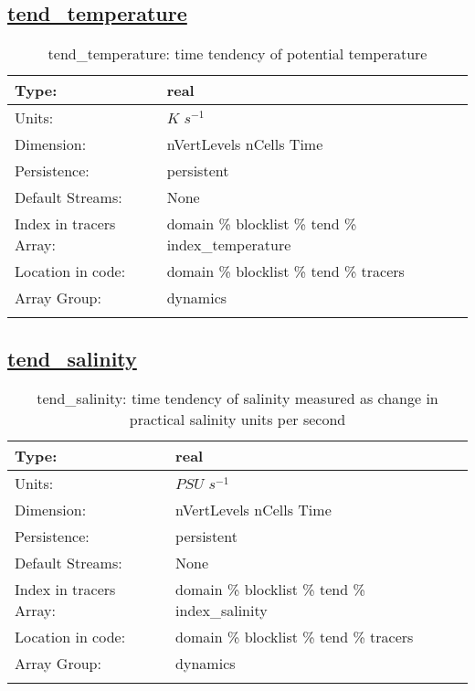 \subsection[tend\_temperature]{\hyperref[sec:var_tab_tend]{tend\_temperature}}
\label{subsec:var_sec_tend_tend_temperature}
\begin{center}
\begin{longtable}{| p{2.0in} | p{4.0in} |}
        \hline 
        Type: & real \\
        \hline 
        Units: & $K$ $s^{-1}$ \\
        \hline 
        Dimension: & nVertLevels nCells Time \\
        \hline 
        Persistence: & persistent \\
        \hline 
		 Default Streams: & None \\
        \hline 
		 Index in tracers Array: & domain \% blocklist \% tend \% index\_temperature \\
		 \hline 
		 Location in code: & domain \% blocklist \% tend \% tracers \\
		 \hline 
		 Array Group: & dynamics \\
		 \hline 
    \caption{tend\_temperature: time tendency of potential temperature}
\end{longtable}
\end{center}
\subsection[tend\_salinity]{\hyperref[sec:var_tab_tend]{tend\_salinity}}
\label{subsec:var_sec_tend_tend_salinity}
\begin{center}
\begin{longtable}{| p{2.0in} | p{4.0in} |}
        \hline 
        Type: & real \\
        \hline 
        Units: & $PSU$ $s^{-1}$ \\
        \hline 
        Dimension: & nVertLevels nCells Time \\
        \hline 
        Persistence: & persistent \\
        \hline 
		 Default Streams: & None \\
        \hline 
		 Index in tracers Array: & domain \% blocklist \% tend \% index\_salinity \\
		 \hline 
		 Location in code: & domain \% blocklist \% tend \% tracers \\
		 \hline 
		 Array Group: & dynamics \\
		 \hline 
    \caption{tend\_salinity: time tendency of salinity measured as change in practical salinity units per second}
\end{longtable}
\end{center}
